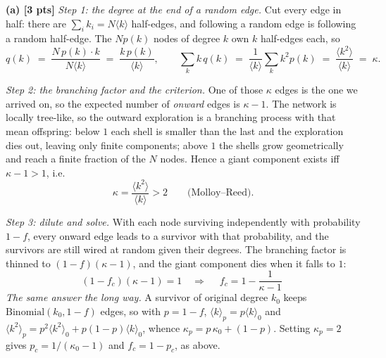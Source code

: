 \documentclass[a4paper, 11pt]{extarticle}
\begin{document}
\vspace{0.4em}

\textbf{(a) [3 pts]} \emph{Step 1: the degree at the end of a random edge.}
Cut every edge in half: there are $\sum_i k_i = N \langle k \rangle$
half-edges, and following a random edge is following a random half-edge. The
$N p(k)$ nodes of degree $k$ own $k$ half-edges each, so
\[
  q(k) \;=\; \frac{N\,p(k) \cdot k}{N \langle k \rangle}
  \;=\; \frac{k\,p(k)}{\langle k \rangle},
  \qquad
  \sum_k k\, q(k) \;=\; \frac{1}{\langle k \rangle}\sum_k k^2 p(k)
  \;=\; \frac{\langle k^2 \rangle}{\langle k \rangle} \;=\; \kappa .
\]

\emph{Step 2: the branching factor and the criterion.} One of those $\kappa$
edges is the one we arrived on, so the expected number of \emph{onward} edges
is $\kappa - 1$. The network is locally tree-like, so the outward exploration
is a branching process with that mean offspring: below $1$ each shell is
smaller than the last and the exploration dies out, leaving only finite
components; above $1$ the shells grow geometrically and reach a finite fraction
of the $N$ nodes. Hence a giant component exists iff $\kappa - 1 > 1$, i.e.
\[
  \kappa = \frac{\langle k^2 \rangle}{\langle k \rangle} > 2
  \qquad \text{(Molloy--Reed)} .
\]

\emph{Step 3: dilute and solve.} With each node surviving independently with
probability $1-f$, every onward edge leads to a survivor with that
probability, and the survivors are still wired at random given their degrees.
The branching factor is thinned to $(1-f)(\kappa - 1)$, and the giant
component dies when it falls to $1$:
\[
  (1-f_c)(\kappa - 1) = 1
  \quad\Longrightarrow\quad
  \boxed{\;f_c = 1 - \frac{1}{\kappa - 1}\;}
\]
\emph{The same answer the long way.} A survivor of original degree $k_0$ keeps
$\mathrm{Binomial}(k_0, 1-f)$ edges, so with $p = 1-f$,
$\langle k \rangle_p = p \langle k \rangle_0$ and
$\langle k^2 \rangle_p = p^2 \langle k^2 \rangle_0 + p(1-p)\langle k \rangle_0$,
whence $\kappa_p = p\,\kappa_0 + (1-p)$. Setting $\kappa_p = 2$ gives
$p_c = 1/(\kappa_0 - 1)$ and $f_c = 1 - p_c$, as above.
\end{document}
